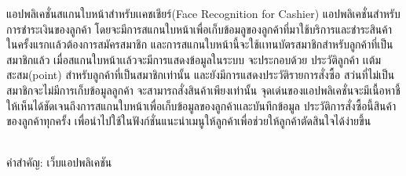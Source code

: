 \begin{thaiabstract}
	แอปพลิเคชั่นสแกนใบหน้าสำหรับเเคชเชียร์(Face Recognition for  Cashier) แอปพลิเคชั่นสำหรับการชำระเงินของลูกค้า โดยจะมีการสแกนใบหน้าเพื่อเก็บข้อมลูของลูกค้าที่มาใช้บริการและชำระสินค้าในครั้งแรกเเล้วต้องการสมัครสมาชิก และการสแกนใบหน้านี้จะใช้เเทนบัตรสมาชิกสำหรับลูกค้าที่เป็นสมาชิกแล้ว เมื่อสแกนใบหน้าเเล้วจะมีการแสดงข้อมูลในระบบ จะประกอบด้วย ประวัติลูกค้า เเต้มสะสม(point) สำหรับลูกค้าที่เป็นสมาชิกเท่านั้น และยังมีการแสดงประวัติรายการสั่งซื้อ สว่นที่ไม่เป็นสมาชิกจะไม่มีการเก็บข้อมูลลูกค้า จะสามารถสั่งสินค้าเพียงเท่านั้น จุดเด่นของแอปพลิเคชั่นจะมีเนื้อหาชี้ให้เห็นได้ชัดเจนถึงการสแกนใบหน้าเพื่อเก็บข้อมูลของลูกค้าเเละบันทึกข้อมูล ประวัติการสั่งซื้อนี้สินค้าของลูกค้าทุกครั้ง เพื่อนำไปใช้ในฟังก์ชั่นแนะนำเมนูให้ลูกค้าเพื่อช่วยให้ลูกค้าตัดสินใจได้ง่ายขึ้น

\noindent
\\คำสำคัญ: เว็บแอปพลิเคชัน 
\end{thaiabstract}
